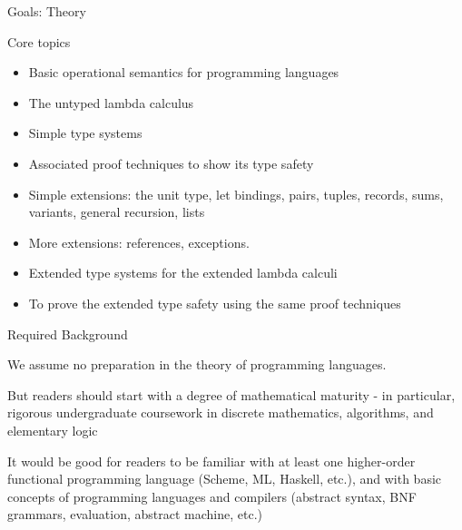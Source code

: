 \documentclass[table]{beamer}
\begin{document}
\begin{frame}[t]{Goals: Theory} \vspace{10pt}

Core topics
\begin{itemize}
\item Basic operational semantics for programming languages
\item The untyped lambda calculus
\item Simple type systems
\item Associated proof techniques to show its type safety
\item Simple extensions: the unit type, let bindings, pairs, tuples, records, sums, variants, general recursion, lists
\item More extensions: references, exceptions.
\item Extended type systems for the extended lambda calculi 
\item To prove the extended type safety using the same proof techniques
\end{itemize}

\end{frame}

\begin{frame}[t]{Required Background} \vspace{10pt}

We assume no preparation in the theory of programming languages.

\vspace{10pt}

But readers should start with a degree of mathematical maturity - in particular, rigorous undergraduate coursework in discrete mathematics, algorithms, and elementary logic

\vspace{10pt}

It would be good for readers to be familiar with at least one higher-order functional programming language (Scheme, ML, Haskell, etc.), and with basic concepts of programming languages and compilers (abstract syntax, BNF grammars, evaluation, abstract machine, etc.)

\end{frame}
\end{document}

